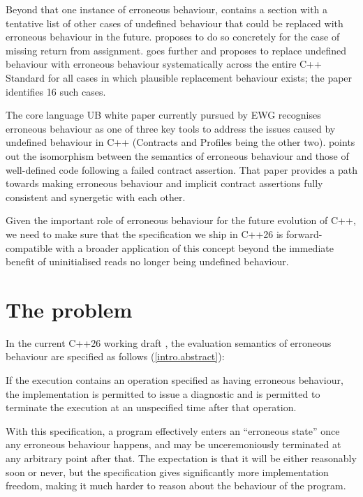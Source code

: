 Beyond that one instance of erroneous behaviour, \cite{P2795R5} contains a section with a tentative list of other cases of undefined behaviour that could be replaced with erroneous behaviour in the future. \cite{P2973R0} proposes to do so concretely for the case of missing return from assignment. \cite{P3100R4} goes further and proposes to replace undefined behaviour with erroneous behaviour systematically across the entire C++ Standard for all cases in which plausible replacement behaviour exists; the paper identifies 16 such cases.

The core language UB white paper \cite{P3656R1} currently pursued by EWG recognises erroneous behaviour as one of three key tools to address the issues caused by undefined behaviour in C++ (Contracts and Profiles being the other two). \cite{P3229R0} points out the isomorphism between the semantics of erroneous behaviour and those of well-defined code following a failed contract assertion. That paper provides a path towards making erroneous behaviour and implicit contract assertions fully consistent and synergetic with each other.

Given the important role of erroneous behaviour for the future evolution of C++, we need to make sure that the specification we ship in C++26 is forward-compatible with a broader application of this concept beyond the immediate benefit of uninitialised reads no longer being undefined behaviour.

\section{The problem}

In the current C++26 working draft \cite{N5014}, the evaluation semantics of erroneous behaviour are specified as follows (\href{https://eel.is/c++draft/intro.abstract#6.sentence-5}{[intro.abstract]}):
\begin{adjustwidth}{0.5cm}{0.5cm}
If the execution contains an operation specified as having erroneous behaviour, the implementation is permitted to issue a diagnostic and is permitted to terminate the execution at an unspecified time after that operation.
\end{adjustwidth} 
With this specification, a program effectively enters an ``erroneous state'' once any erroneous behaviour happens, and may be unceremoniously terminated at any arbitrary point after that.  The expectation is that it will be either reasonably soon or never, but the specification gives significantly more implementation freedom, making it much harder to reason about the behaviour of the program.

